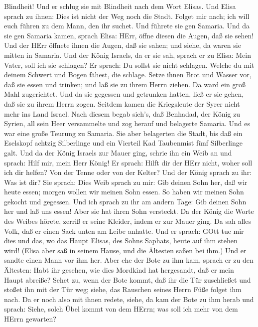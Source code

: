 Blindheit! Und er schlug sie mit Blindheit nach dem Wort Elisas.
 Und Elisa sprach zu ihnen: Dies ist nicht der Weg noch die
Stadt. Folget mir nach; ich will euch führen zu dem Mann, den ihr
suchet. Und führete sie gen Samaria.  Und da sie gen
Samaria kamen, sprach Elisa: HErr, öffne diesen die Augen, daß sie
sehen! Und der HErr öffnete ihnen die Augen, daß sie sahen; und siehe,
da waren sie mitten in Samaria.  Und der König Israels, da
er sie sah, sprach er zu Elisa: Mein Vater, soll ich sie schlagen?
 Er sprach: Du sollst sie nicht schlagen. Welche du mit
deinem Schwert und Bogen fähest, die schlage. Setze ihnen Brot und
Wasser vor, daß sie essen und trinken; und laß sie zu ihrem Herrn
ziehen.  Da ward ein groß Mahl zugerichtet. Und da sie
gegessen und getrunken hatten, ließ er sie gehen, daß sie zu ihrem Herrn
zogen. Seitdem kamen die Kriegsleute der Syrer nicht mehr ins Land
Israel.  Nach diesem begab sich's, daß Benhadad, der König
zu Syrien, all sein Heer versammelte und zog herauf und belagerte
Samaria.  Und es war eine große Teurung zu Samaria. Sie
aber belagerten die Stadt, bis daß ein Eselskopf achtzig Silberlinge und
ein Vierteil Kad Taubenmist fünf Silberlinge galt.  Und da
der König Israels zur Mauer ging, schrie ihn ein Weib an und sprach:
Hilf mir, mein Herr König!  Er sprach: Hilft dir der HErr
nicht, woher soll ich dir helfen? Von der Tenne oder von der Kelter?
 Und der König sprach zu ihr: Was ist dir? Sie sprach: Dies
Weib sprach zu mir: Gib deinen Sohn her, daß wir heute essen; morgen
wollen wir meinen Sohn essen.  So haben wir meinen Sohn
gekocht und gegessen. Und ich sprach zu ihr am andern Tage: Gib deinen
Sohn her und laß uns essen! Aber sie hat ihren Sohn versteckt.
 Da der König die Worte des Weibes hörete, zerriß er seine
Kleider, indem er zur Mauer ging. Da sah alles Volk, daß er einen Sack
unten am Leibe anhatte.  Und er sprach: GOtt tue mir dies
und das, wo das Haupt Elisas, des Sohns Saphats, heute auf ihm stehen
wird!  (Elisa aber saß in seinem Hause, und die Ältesten
saßen bei ihm.) Und er sandte einen Mann vor ihm her. Aber ehe der Bote
zu ihm kam, sprach er zu den Ältesten: Habt ihr gesehen, wie dies
Mordkind hat hergesandt, daß er mein Haupt abreiße? Sehet zu, wenn der
Bote kommt, daß ihr die Tür zuschließet und stoßet ihn mit der Tür weg;
siehe, das Rauschen seines Herrn Füße folget ihm nach.  Da
er noch also mit ihnen redete, siehe, da kam der Bote zu ihm herab und
sprach: Siehe, solch Übel kommt von dem HErrn; was soll ich mehr von dem
HErrn gewarten?

